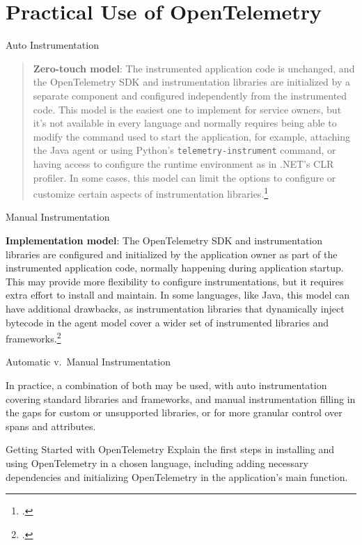 \documentclass[aspectratio=169]{beamer}
\begin{document}
\section{Practical Use of OpenTelemetry}
\begin{frame}{Auto Instrumentation}

  \begin{quote}

    \textbf{Zero-touch model}: The instrumented application code is unchanged,
    and the OpenTelemetry SDK and instrumentation libraries are initialized by a
    separate component and configured independently from the instrumented code.
    This model is the easiest one to implement for service owners, but it's not
    available in every language and normally requires being able to modify the
    command used to start the application, for example, attaching the Java agent
    or using Python's \lstinline{telemetry-instrument} command, or having access
    to configure the runtime environment as in .NET's CLR profiler. In some
    cases, this model can limit the options to configure or customize certain
    aspects of instrumentation libraries.\footcite[ch.~4]{practical-otel}

  \end{quote}

\end{frame}

\begin{frame}{Manual Instrumentation}

  \textbf{Implementation model}: The OpenTelemetry SDK and instrumentation
  libraries are configured and initialized by the application owner as part of the
  instrumented application code, normally happening during application startup.
  This may provide more flexibility to configure instrumentations, but it requires
  extra effort to install and maintain. In some languages, like Java, this model
  can have additional drawbacks, as instrumentation libraries that dynamically
  inject bytecode in the agent model cover a wider set of instrumented libraries
  and frameworks.\footcite[ch.~4]{practical-otel}

\end{frame}

\begin{frame}{Automatic v.~Manual Instrumentation}

  In practice, a combination of both may be used, with auto instrumentation
  covering standard libraries and frameworks, and manual instrumentation filling
  in the gaps for custom or unsupported libraries, or for more granular control
  over spans and attributes.

\end{frame}
\begin{frame}{Getting Started with OpenTelemetry}
  Explain the first steps in installing and using OpenTelemetry in a chosen language, including adding necessary dependencies and initializing OpenTelemetry in the application's main function.
\end{frame}
\end{document}
